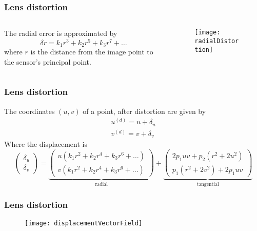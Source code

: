 \begin{frame}
\frametitle{Lens distortion}
\begin{columns}
\begin{column}{.5\textwidth}
The radial error is approximated by
\begin{equation}
\delta r = k_{1} r^{3} + k_{2} r^{5} + k_{3} r^{7} + \ldots
\end{equation}
where $r$ is the distance from the image point to the sensor's principal point.
\end{column}
\begin{column}{.5\textwidth}
\begin{figure}[!h]
\centering
\texttt{[image: radialDistortion]}
\end{figure}
\end{column}
\end{columns}
\end{frame}

\begin{frame}
\frametitle{Lens distortion}
The coordinates $(u,v)$ of a point, after distortion are given by
\begin{equation}
\begin{array}{c}
u^{(d)} = u + \delta_u \\
v^{(d)} = v + \delta	_v
\end{array}
\end{equation}
Where the displacement is
\begin{equation}
\left (
\begin{array}{c}
\delta_u \\
\delta_v
\end{array}
\right )
=
\underbrace{
\left (
\begin{array}{c}
u \left ( k_{1} r^{2} + k_{2} r^{4} + k_{3} r^{6} + \ldots \right ) \\
v \left ( k_{1} r^{2} + k_{2} r^{4} + k_{3} r^{6} + \ldots \right )
\end{array}
\right )
}_{\text{radial}}
+
\underbrace{
\left (
\begin{array}{c}
2p_{1} uv + p_{2} (r^{2} + 2 u^{2})\\
p_1 ( r^{2} + 2v^{2} ) + 2p_1 uv
\end{array}
\right )
}_{\text{tangential}}
\end{equation}
\end{frame}

\begin{frame}
\frametitle{Lens distortion}
\begin{figure}[!h]
\centering
\texttt{[image: displacementVectorField]}
\end{figure}
\end{frame}

